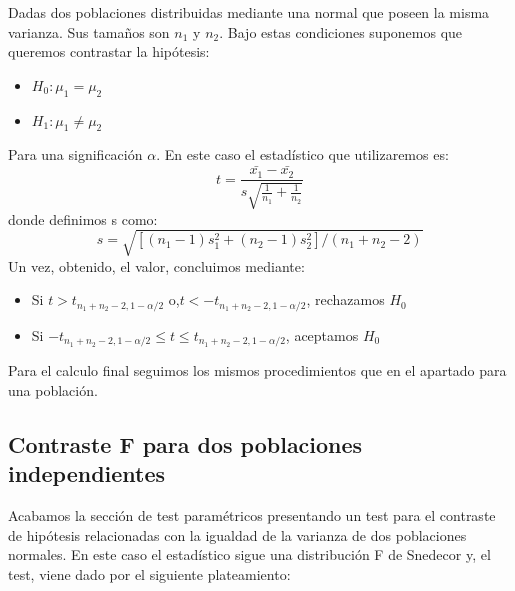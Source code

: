\documentclass[a4paper,12pt]{article}
\begin{document}
Dadas dos poblaciones distribuidas mediante una normal que poseen la misma varianza. Sus tamaños son  $n_1$ y $n_2$. Bajo estas condiciones suponemos que queremos contrastar la hipótesis:
\begin{itemize}
	\item $H_0:\mu_1=\mu_2$
	\item $H_1:\mu_1\neq \mu_2$
\end{itemize}
Para una significación $\alpha$.
En este caso el estadístico que utilizaremos es: 
$$t=\frac{\bar{x_1}-\bar{x_2}}{s\sqrt{\frac{1}{n_1}+\frac{1}{n_2}}}$$
donde definimos s como:
$$s=\sqrt{[(n_1-1)s_1^2+(n_2-1)s_2^2]/(n_1+n_2-2)}$$
Un vez, obtenido, el valor, concluimos mediante:
\begin{itemize}
	\item Si $t>t_{n_1+n_2-2,1-\alpha/2}$ o,$t<-t_{n_1+n_2-2,1-\alpha/2}$, rechazamos $H_0$
	\item Si $-t_{n_1+n_2-2,1-\alpha/2}\leq t\leq t_{n_1+n_2-2,1-\alpha/2}$, aceptamos $H_0$
\end{itemize}
Para el calculo final seguimos los mismos procedimientos que en el apartado para una población.

\subsection{Contraste F para dos poblaciones independientes }
Acabamos la sección de test paramétricos presentando un test para el contraste de hipótesis relacionadas con la igualdad de la varianza de dos poblaciones normales.
En este caso el estadístico sigue una distribución F de Snedecor y, el test, viene dado por el siguiente plateamiento:
\end{document}
